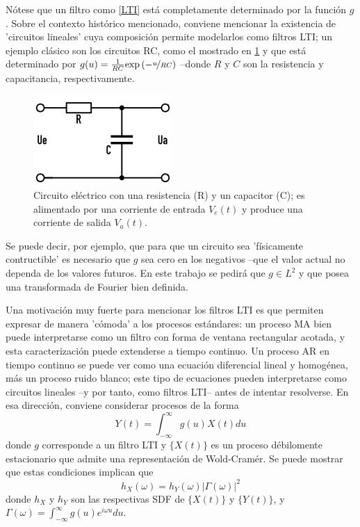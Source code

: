 \documentclass[12pt,a4paper]{mitthesis}
\newcommand{\intR}{\int_{-\infty}^{\infty}}
\newcommand{\abso}[1]{\left| #1 \right|}
\begin{document}
N\'otese que un filtro como \ref{LTI} est\'a completamente determinado por la funci\'on $g$. 
Sobre el contexto hist\'orico mencionado, conviene mencionar la existencia de 'circuitos lineales' 
cuya composici\'on permite modelarlos como filtros LTI; un ejemplo cl\'asico son los circuitos RC, 
como el mostrado en \ref{rrcc} y que est\'a determinado por
$g(u) = \frac{1}{R C} \text{exp}\left( -\nicefrac{u}{R C} \right)$ --donde $R$ y $C$ son la
resistencia y capacitancia, respectivamente.

\begin{figure}
\centering
\includegraphics[width=0.4\linewidth]{rc.png} 
\caption{Circuito el\'ectrico con una resistencia (R) y un capacitor (C); es alimentado por una 
corriente de entrada $V_e(t)$ y produce una corriente de salida $V_a(t)$. 
}
\label{rrcc}
\end{figure}

Se puede decir, por ejemplo, que para que un circuito sea 'f\'isicamente contructible' es necesario 
que $g$ sea cero en los negativos --que el valor actual no dependa de los valores futuros. En este 
trabajo se pedir\'a que $g\in L^{2}$ y que posea una transformada de Fourier bien definida.

Una motivaci\'on muy fuerte para mencionar los filtros LTI es que permiten expresar de manera
'c\'omoda' a los procesos est\'andares: un proceso MA bien puede interpretarse como un filtro con 
forma de ventana rectangular acotada, y esta caracterizaci\'on puede extenderse a tiempo continuo.
Un proceso AR en tiempo continuo se puede ver como una ecuaci\'on diferencial lineal y homog\'enea,
m\'as un proceso ruido blanco; este tipo de ecuaciones pueden interpretarse como circuitos lineales
--y por tanto, como filtros LTI-- antes de intentar resolverse.
En esa direcci\'on, conviene considerar procesos de la forma
\begin{equation*}
Y(t) = \intR g(u) X(t) du
\end{equation*}
donde $g$ corresponde a un filtro LTI y $\{ X(t) \}$ es un proceso d\'ebilomente estacionario que
admite una representaci\'on de Wold-Cram\'er. Se puede mostrar que estas condiciones implican que
\begin{equation*}
h_X(\omega) = h_Y(\omega) \abso{\Gamma(\omega)}^{2}
\end{equation*}
donde $h_X$ y $h_Y$ son las respectivas SDF de $\{X(t)\}$ y $\{Y(t)\}$, y 
$\Gamma(\omega) = \intR g(u) e^{i \omega u} du$.
\end{document}
